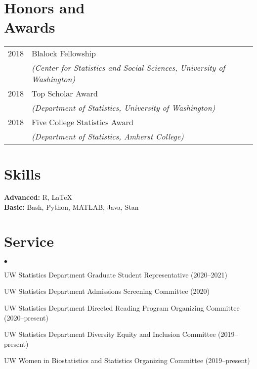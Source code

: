 \documentclass[margin,centered]{res}
\newenvironment{list1}{
  \begin{list}{\ding{113}}{%
      \setlength{\itemsep}{0in}
      \setlength{\parsep}{0in} \setlength{\parskip}{0in}
      \setlength{\topsep}{0in} \setlength{\partopsep}{0in}
      \setlength{\leftmargin}{0.17in}}}{\end{list}}
\newenvironment{list2}{
  \begin{list}{$\bullet$}{%
      \setlength{\itemsep}{0in}
      \setlength{\parsep}{0in} \setlength{\parskip}{0in}
      \setlength{\topsep}{0in} \setlength{\partopsep}{0in}
      \setlength{\leftmargin}{0.2in}}}{\end{list}}
\begin{document}
\begin{resume}
\section{\sc Honors and\\ Awards}

\begin{tabular}{@{}p{0.8in}p{4in}}
2018 & Blalock Fellowship \\
&\textit{(Center for Statistics and Social Sciences, University of Washington)}\\
2018 & Top Scholar Award\\
&\textit{(Department of Statistics, University of Washington)}\\
2018 & Five College Statistics Award \\
&\textit{(Department of Statistics, Amherst College)}
\end{tabular}

\section{\sc Skills}
{\bf Advanced:} R, LaTeX\\
{\bf Basic:} Bash, Python, MATLAB, Java, Stan 


\section{\sc Service}

\begin{list1}
\item[]
\begin{list2}
\vspace*{.05in}
\item UW Statistics Department Graduate Student Representative (2020--2021) 
\item UW Statistics Department Admissions Screening Committee (2020)
\item UW Statistics Department Directed Reading Program Organizing Committee (2020--present)
\item UW Statistics Department Diversity Equity and Inclusion Committee (2019--present)
\item UW Women in Biostatistics and Statistics Organizing Committee (2019--present)
\end{list2}
\end{list1}


\end{resume}
\end{document}
